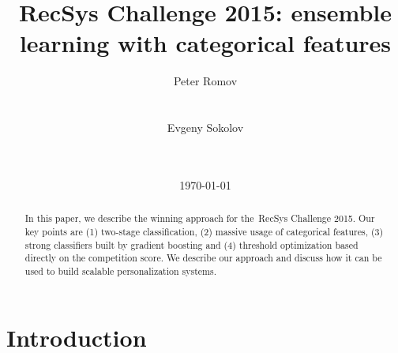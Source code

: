 \documentclass{sig-alternate}
\begin{document}

\title{RecSys Challenge 2015: ensemble learning with categorical features}

\author{
\alignauthor
Peter Romov\\
       \\
       \\
\alignauthor
Evgeny Sokolov\\
       \\
       \\
}

\date{\today}

\maketitle
\begin{abstract}
In this paper, we describe the winning approach for the~RecSys Challenge 2015.
Our key points are
(1) two-stage classification,
(2) massive usage of categorical features,
(3) strong classifiers built by gradient boosting and
(4) threshold optimization based directly on the competition score.
We describe our approach and discuss how it can be used
to build scalable personalization systems.
\end{abstract}



\section{Introduction}
\end{document}
